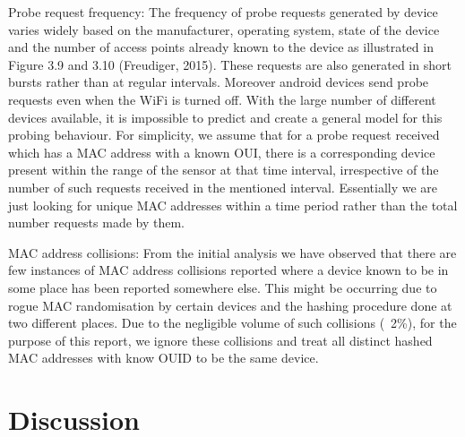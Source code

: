 Probe request frequency: The frequency of probe requests generated by device varies widely based on the manufacturer, operating system, state of the device and the number of access points already known to the device as illustrated in Figure 3.9 and 3.10 (Freudiger, 2015).
These requests are also generated in short bursts rather than at regular intervals.
Moreover android devices send probe requests even when the WiFi is turned off.
With the large number of different devices available, it is impossible to predict and create a general model for this probing behaviour.
For simplicity, we assume that for a probe request received which has a MAC address with a known OUI, there is a corresponding device present within the range of the sensor at that time interval, irrespective of the number of such requests received in the mentioned interval.
Essentially we are just looking for unique MAC addresses within a time period rather than the total number requests made by them.

MAC address collisions: From the initial analysis we have observed that there are few instances of MAC address collisions reported where a device known to be in some place has been reported somewhere else.
This might be occurring due to rogue MAC randomisation by certain devices and the hashing procedure done at two different places.
Due to the negligible volume of such collisions (~2\%), for the purpose of this report, we ignore these collisions and treat all distinct hashed MAC addresses with know OUID to be the same device.

\section{Discussion}
